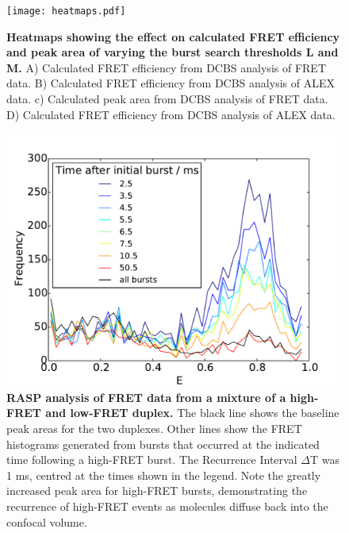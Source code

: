 \documentclass[10pt]{article}
\begin{document}
\begin{figure}[!ht]
   \begin{center}
      \texttt{[image: heatmaps.pdf]}
      \caption{{\bf Heatmaps showing the effect on calculated FRET efficiency and peak area of varying the burst search thresholds L and M.} A) Calculated FRET efficiency from DCBS analysis of FRET data. B) Calculated FRET efficiency from DCBS analysis of ALEX data. c) Calculated peak area from DCBS analysis of FRET data. D) Calculated FRET efficiency from DCBS analysis of ALEX data.}
      \label{fig:fig8_heatmaps}
   \end{center}
\end{figure}

\begin{figure}[!ht]
   \begin{center}
      \includegraphics*[clip=true, width=6in]{RASP_performance.pdf}
      \caption{{\bf RASP analysis of FRET data from a mixture of a high-FRET and low-FRET duplex.} The black line shows the baseline peak areas for the two duplexes. Other lines show the FRET histograms generated from bursts that occurred at the indicated time following a high-FRET burst. The Recurrence Interval $\Delta$T was 1 ms, centred at the times shown in the legend. Note the greatly increased peak area for high-FRET bursts, demonstrating the recurrence of high-FRET events as molecules diffuse back into the confocal volume.}
      \label{fig:fig9_RASP}
   \end{center}
\end{figure}
\end{document}
